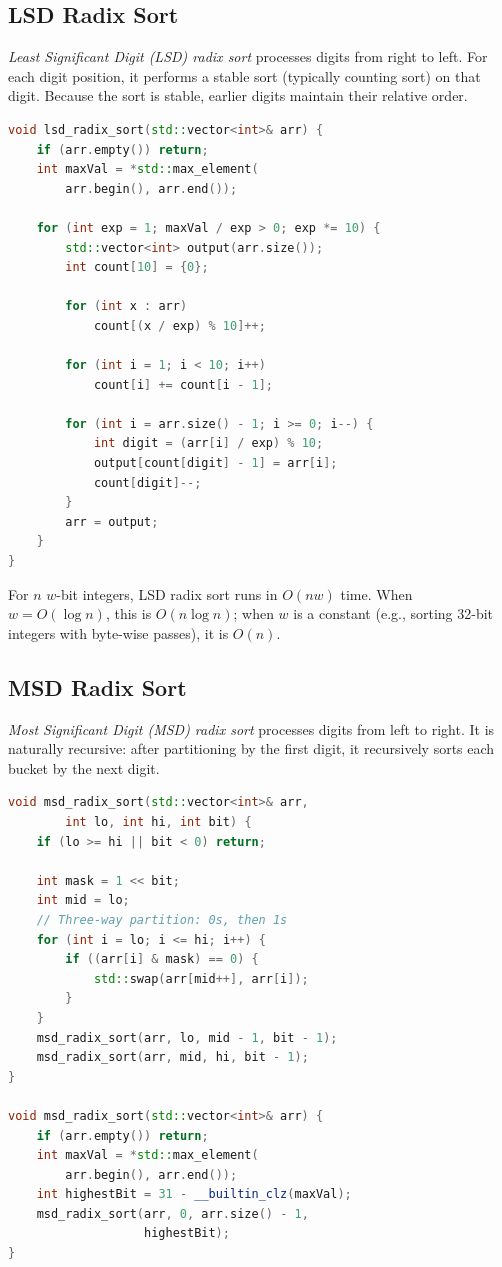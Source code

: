 \subsection{LSD Radix Sort}

\emph{Least Significant Digit (LSD) radix sort} processes digits from right to left. For each digit position, it performs a stable sort (typically counting sort) on that digit. Because the sort is stable, earlier digits maintain their relative order.

\begin{lstlisting}[language=C++]
void lsd_radix_sort(std::vector<int>& arr) {
    if (arr.empty()) return;
    int maxVal = *std::max_element(
        arr.begin(), arr.end());

    for (int exp = 1; maxVal / exp > 0; exp *= 10) {
        std::vector<int> output(arr.size());
        int count[10] = {0};

        for (int x : arr)
            count[(x / exp) % 10]++;

        for (int i = 1; i < 10; i++)
            count[i] += count[i - 1];

        for (int i = arr.size() - 1; i >= 0; i--) {
            int digit = (arr[i] / exp) % 10;
            output[count[digit] - 1] = arr[i];
            count[digit]--;
        }
        arr = output;
    }
}
\end{lstlisting}

For $n$ $w$-bit integers, LSD radix sort runs in $O(nw)$ time. When $w = O(\log n)$, this is $O(n \log n)$; when $w$ is a constant (e.g., sorting 32-bit integers with byte-wise passes), it is $O(n)$.

\subsection{MSD Radix Sort}

\emph{Most Significant Digit (MSD) radix sort} processes digits from left to right. It is naturally recursive: after partitioning by the first digit, it recursively sorts each bucket by the next digit.

\begin{lstlisting}[language=C++]
void msd_radix_sort(std::vector<int>& arr,
        int lo, int hi, int bit) {
    if (lo >= hi || bit < 0) return;

    int mask = 1 << bit;
    int mid = lo;
    // Three-way partition: 0s, then 1s
    for (int i = lo; i <= hi; i++) {
        if ((arr[i] & mask) == 0) {
            std::swap(arr[mid++], arr[i]);
        }
    }
    msd_radix_sort(arr, lo, mid - 1, bit - 1);
    msd_radix_sort(arr, mid, hi, bit - 1);
}

void msd_radix_sort(std::vector<int>& arr) {
    if (arr.empty()) return;
    int maxVal = *std::max_element(
        arr.begin(), arr.end());
    int highestBit = 31 - __builtin_clz(maxVal);
    msd_radix_sort(arr, 0, arr.size() - 1,
                   highestBit);
}
\end{lstlisting}

